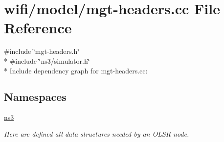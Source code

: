 \hypertarget{mgt-headers_8cc}{}\section{wifi/model/mgt-\/headers.cc File Reference}
\label{mgt-headers_8cc}
{\ttfamily \#include \char`\"{}mgt-\/headers.\+h\char`\"{}}\\*
{\ttfamily \#include \char`\"{}ns3/simulator.\+h\char`\"{}}\\*
Include dependency graph for mgt-\/headers.cc\+:
\subsection*{Namespaces}
\begin{DoxyCompactItemize}
\item 
 \hyperlink{namespacens3}{ns3}
\begin{DoxyCompactList}\small\item\em Here are defined all data structures needed by an O\+L\+SR node. \end{DoxyCompactList}\end{DoxyCompactItemize}
